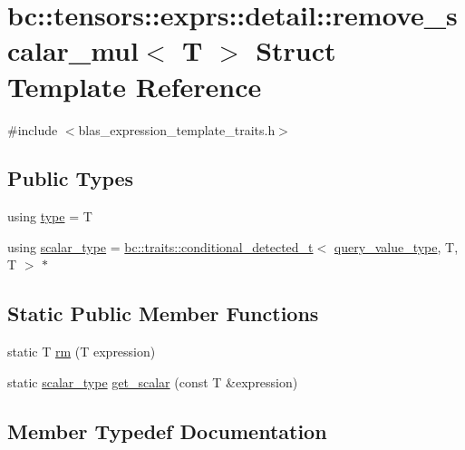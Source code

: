\hypertarget{structbc_1_1tensors_1_1exprs_1_1detail_1_1remove__scalar__mul}{}\section{bc\+:\+:tensors\+:\+:exprs\+:\+:detail\+:\+:remove\+\_\+scalar\+\_\+mul$<$ T $>$ Struct Template Reference}
\label{structbc_1_1tensors_1_1exprs_1_1detail_1_1remove__scalar__mul}


{\ttfamily \#include $<$blas\+\_\+expression\+\_\+template\+\_\+traits.\+h$>$}

\subsection*{Public Types}
\begin{DoxyCompactItemize}
\item 
using \hyperlink{structbc_1_1tensors_1_1exprs_1_1detail_1_1remove__scalar__mul_a5818f6f0ff263d6c03e59e71293b0ec9}{type} = T
\item 
using \hyperlink{structbc_1_1tensors_1_1exprs_1_1detail_1_1remove__scalar__mul_a9732e37c5848f3501c4f715c537e3a0f}{scalar\+\_\+type} = \hyperlink{namespacebc_1_1traits_a1a6d378947ec32acd457890854bcd592}{bc\+::traits\+::conditional\+\_\+detected\+\_\+t}$<$ \hyperlink{namespacebc_1_1tensors_1_1exprs_1_1detail_aa60e0a71bcf8048661b38b904c620fb0}{query\+\_\+value\+\_\+type}, T, T $>$ $\ast$
\end{DoxyCompactItemize}
\subsection*{Static Public Member Functions}
\begin{DoxyCompactItemize}
\item 
static T \hyperlink{structbc_1_1tensors_1_1exprs_1_1detail_1_1remove__scalar__mul_af6151fcaf6bbfa11139fbe8a978af01a}{rm} (T expression)
\item 
static \hyperlink{structbc_1_1tensors_1_1exprs_1_1detail_1_1remove__scalar__mul_a9732e37c5848f3501c4f715c537e3a0f}{scalar\+\_\+type} \hyperlink{structbc_1_1tensors_1_1exprs_1_1detail_1_1remove__scalar__mul_a62e9da47845971edc6e698466e888d05}{get\+\_\+scalar} (const T \&expression)
\end{DoxyCompactItemize}


\subsection{Member Typedef Documentation}
\mbox{\label{structbc_1_1tensors_1_1exprs_1_1detail_1_1remove__scalar__mul_a9732e37c5848f3501c4f715c537e3a0f}} 
